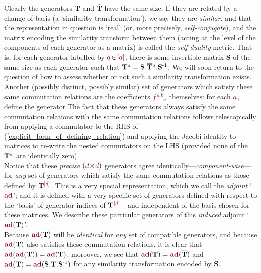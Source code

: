\documentclass[12pt,a4paper]{article}\let\ifpdf\relax
\begin{document}
Clearly the generators $\mathbf{T}$ and $\mathbf{\bar{T}}$ have the same size. If they are related by a change of basis (a `similarity transformation'), we say they are \emph{similar}, and that the representation in question is `real' (or, more precisely, \emph{self-conjugate}), and the matrix encoding the similarity transform between them (acting at the level of the components of each generator as a matrix) is called the \emph{self-duality} metric. That is, for each generator labelled by $\r{a}\!\in\!\r{[d]}$, there is some invertible matrix  $\mathbf{S}$ of the same size as each generator such that $\mathbf{T}\indices{\r{a}}{}=\mathbf{S}.\mathbf{\bar{T}}\indices{\r{a}}{}.\mathbf{S}^{\text{-}1}$. We will soon return to the question of how to assess whether or not such a similarity transformation exists.\\[-10pt]

Another (possibly distinct, possibly similar) set of generators which satisfy these same commutation relations are the coefficients $\r{f}\indices{\r{a\,b}}{\r{c}}$ themselves: for each $\r{a}$, define the generator 
%
%
The fact that these generators always satisfy the same commutation relations with the same commutation relations follows telescopically from applying a commutator to the RHS of (\ref{explicit_form_of_defining_relation}) and applying the Jacobi identity to matrices to re-write the nested commutators on  the LHS (provided none of the $\mathbf{T}\indices{\r{a}}{}$ are identically zero).\\[-10pt]

Notice that these \emph{precise} $(\r{d}\!\times\!\r{d})$ generators agree identically---\emph{component-wise}---for \emph{any} set of generators which satisfy the same commutation relations as those defined by $\mathbf{T}\indices{\r{[d]}}{}$. This is a very special representation, which we call the \emph{adjoint} `$\mathbf{\r{ad}}$'; and it is defined with a very specific set of generators defined with respect to the `basis' of generator indices of $\mathbf{T}\indices{\r{[d]}}{}$---and independent of the basis chosen for these matrices. We describe these particular generators of this \emph{induced} adjoint `$\mathbf{\r{ad}}(\mathbf{T})$'.\\[-10pt]

Because $\mathbf{\r{ad}}(\mathbf{T})$ will be \emph{identical} for \emph{any} set of compatible generators, and because $\mathbf{\r{ad}}(\mathbf{T})$ also satisfies these commutation relations, it is clear that $\mathbf{\r{ad}}(\mathbf{\r{ad}}(\mathbf{T}))=\mathbf{\r{ad}}(\mathbf{T})$; moreover, we see that $\mathbf{\r{ad}}(\mathbf{T})=\mathbf{\r{ad}}(\mathbf{\bar{T}})$ and $\mathbf{\r{ad}}(\mathbf{T})=\mathbf{\r{ad}}(\mathbf{S}.\mathbf{T}.\mathbf{S}^{\text{-}1})$ for any similarity transformation encoded by $\mathbf{S}$. 
\end{document}
